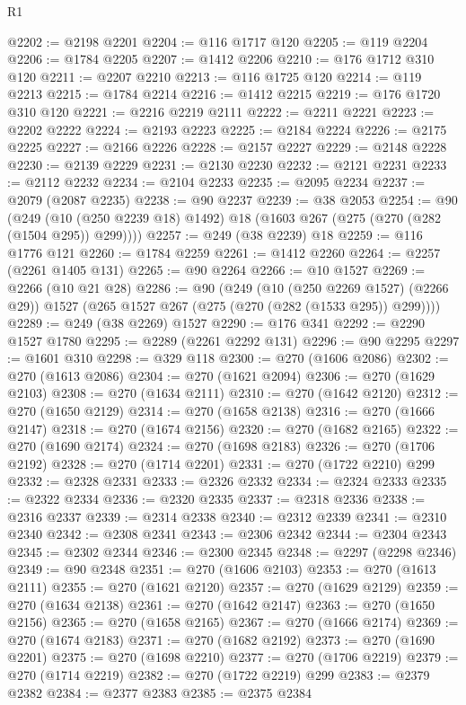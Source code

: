 \begin{lexlean}{R1}
\begin{coremodule}
@2202 := @2198 @2201
@2204 := @116 @1717 @120
@2205 := @119 @2204
@2206 := @1784 @2205
@2207 := @1412 @2206
@2210 := @176 @1712 @310 @120
@2211 := @2207 @2210
@2213 := @116 @1725 @120
@2214 := @119 @2213
@2215 := @1784 @2214
@2216 := @1412 @2215
@2219 := @176 @1720 @310 @120
@2221 := @2216 @2219 @2111
@2222 := @2211 @2221
@2223 := @2202 @2222
@2224 := @2193 @2223
@2225 := @2184 @2224
@2226 := @2175 @2225
@2227 := @2166 @2226
@2228 := @2157 @2227
@2229 := @2148 @2228
@2230 := @2139 @2229
@2231 := @2130 @2230
@2232 := @2121 @2231
@2233 := @2112 @2232
@2234 := @2104 @2233
@2235 := @2095 @2234
@2237 := @2079 (@2087 @2235)
@2238 := @90 @2237
@2239 := @38 @2053
@2254 := @90
    (@249 (@10 (@250 @2239 @18) @1492) @18 (@1603 @267 (@275 (@270 (@282 (@1504 @295)) @299))))
@2257 := @249 (@38 @2239) @18
@2259 := @116 @1776 @121
@2260 := @1784 @2259
@2261 := @1412 @2260
@2264 := @2257 (@2261 @1405 @131)
@2265 := @90 @2264
@2266 := @10 @1527
@2269 := @2266 (@10 @21 @28)
@2286 := @90
    (@249
      (@10 (@250 @2269 @1527) (@2266 @29))
      @1527
      (@265 @1527 @267 (@275 (@270 (@282 (@1533 @295)) @299))))
@2289 := @249 (@38 @2269) @1527
@2290 := @176 @341
@2292 := @2290 @1527 @1780
@2295 := @2289 (@2261 @2292 @131)
@2296 := @90 @2295
@2297 := @1601 @310
@2298 := @329 @118
@2300 := @270 (@1606 @2086)
@2302 := @270 (@1613 @2086)
@2304 := @270 (@1621 @2094)
@2306 := @270 (@1629 @2103)
@2308 := @270 (@1634 @2111)
@2310 := @270 (@1642 @2120)
@2312 := @270 (@1650 @2129)
@2314 := @270 (@1658 @2138)
@2316 := @270 (@1666 @2147)
@2318 := @270 (@1674 @2156)
@2320 := @270 (@1682 @2165)
@2322 := @270 (@1690 @2174)
@2324 := @270 (@1698 @2183)
@2326 := @270 (@1706 @2192)
@2328 := @270 (@1714 @2201)
@2331 := @270 (@1722 @2210) @299
@2332 := @2328 @2331
@2333 := @2326 @2332
@2334 := @2324 @2333
@2335 := @2322 @2334
@2336 := @2320 @2335
@2337 := @2318 @2336
@2338 := @2316 @2337
@2339 := @2314 @2338
@2340 := @2312 @2339
@2341 := @2310 @2340
@2342 := @2308 @2341
@2343 := @2306 @2342
@2344 := @2304 @2343
@2345 := @2302 @2344
@2346 := @2300 @2345
@2348 := @2297 (@2298 @2346)
@2349 := @90 @2348
@2351 := @270 (@1606 @2103)
@2353 := @270 (@1613 @2111)
@2355 := @270 (@1621 @2120)
@2357 := @270 (@1629 @2129)
@2359 := @270 (@1634 @2138)
@2361 := @270 (@1642 @2147)
@2363 := @270 (@1650 @2156)
@2365 := @270 (@1658 @2165)
@2367 := @270 (@1666 @2174)
@2369 := @270 (@1674 @2183)
@2371 := @270 (@1682 @2192)
@2373 := @270 (@1690 @2201)
@2375 := @270 (@1698 @2210)
@2377 := @270 (@1706 @2219)
@2379 := @270 (@1714 @2219)
@2382 := @270 (@1722 @2219) @299
@2383 := @2379 @2382
@2384 := @2377 @2383
@2385 := @2375 @2384

\end{coremodule}
\end{lexlean}
